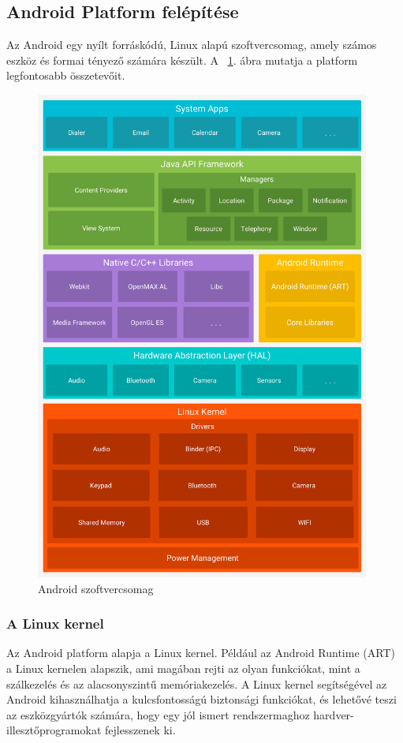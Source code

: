 \documentclass[../main.tex]{subfiles}
\begin{document}
    \subsection{Android Platform felépítése} %
        Az Android egy nyílt forráskódú, Linux alapú szoftvercsomag, amely számos eszköz és formai tényező számára készült. A ~\ref{fig:android_szoftvercsomag}. ábra mutatja a platform legfontosabb összetevőit.
        \begin{figure}[h!]
            \centering
            \includegraphics[width=11cm]{android_res/android_szoftvercsomag.png}
            \caption{Android szoftvercsomag}
            \label{fig:android_szoftvercsomag}
        \end{figure}
        
        \subsubsection{A Linux kernel}
            Az Android platform alapja a Linux kernel. Például az Android Runtime (ART) a Linux kernelen alapszik, ami magában rejti az olyan funkciókat, mint a szálkezelés és az alacsonyszintű  memóriakezelés.
            A Linux kernel segítségével az Android kihasználhatja a kulcsfontosságú biztonsági funkciókat, és lehetővé teszi az eszközgyártók számára, hogy egy jól ismert rendszermaghoz hardver-illesztőprogramokat fejlesszenek ki.
            
\end{document}
